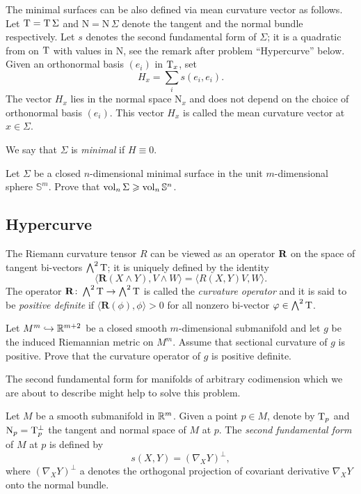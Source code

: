 The minimal surfaces can be also defined via mean curvature vector as follows.
Let $\mathrm{T}=\mathrm{T}\,\Sigma$ and $\mathrm{N}=\mathrm{N}\,\Sigma$ denote the tangent and the normal bundle respectively.
Let $s$ denotes the second fundamental form of $\Sigma$;
it is a quadratic from on $\mathrm{T}$ with values in $\mathrm{N}$,
see the remark after problem ``Hypercurve'' below. 
Given an orthonormal basis $(e_i)$ in $\mathrm{T}_x$, set 
$$H_x=\sum_i s(e_i,e_i).$$
The vector $H_x$ lies in the normal space $\mathrm{N}_x$
and does not depend on the choice of orthonormal basis $(e_i)$.
This vector $H_x$ is called the mean curvature vector at $x\in \Sigma$. 

We say that $\Sigma$ is \emph{minimal} if $H\equiv 0$.

\begin{pr}
Let $\Sigma$ be a closed $n$-dimensional 
minimal surface
in the unit $m$-dimensional sphere $\mathbb{S}^m$.
Prove that
$\operatorname{\rm vol}\nolimits_n \Sigma\geqslant \operatorname{\rm vol}\nolimits_n \mathbb{S}^n$.
\end{pr}

\subsection*{Hypercurve}
\label{codim=2}

The Riemann curvature tensor $R$
can be viewed as an operator $\text{\bf R}$ on the space of tangent bi-vectors $\bigwedge^2 \mathrm{T}$;
it is uniquely defined by the identity
$$\langle\mathbf{R}(X\wedge Y),V\wedge W\rangle
=
\langle R(X,Y)V,W\rangle.$$
The operator $\mathbf{R}\colon\bigwedge^2 \mathrm{T}\to \bigwedge^2 \mathrm{T}$ is called the \emph{curvature operator} and it is said to be {}\emph{positive definite} if
$\langle\mathbf{R}(\phi),\phi\rangle>0$ for all nonzero
bi-vector $\varphi\in\bigwedge^2 \mathrm{T}$.


\begin{pr}
Let $M^m\hookrightarrow \mathbb{R}^{m+2}$ be a closed smooth $m$-dimensional
submanifold and let  $g$ be the  induced Riemannian metric on $M^m$.
Assume that sectional curvature of $g$ is positive.
Prove that the curvature operator of $g$ is positive definite.
\end{pr}

The second fundamental form for manifolds of arbitrary codimension which we are about to describe might help to solve this problem.

Let $M$ be a smooth submanifold in $\mathbb{R}^m$.
Given a point $p\in M$, denote by $\mathrm{T}_p$ and $\mathrm{N}_p=\mathrm{T}_p^\bot$
the tangent and normal space of $M$ at $p$.
The \emph{second fundamental form}\label{page:second fundamental form} of $M$ at $p$ is defined by 
\[s(X,Y)=(\nabla_X Y)^\bot,\]
where $(\nabla_X Y)^\bot$ a denotes the orthogonal projection of covariant derivative $\nabla_X Y$ onto the normal bundle.

